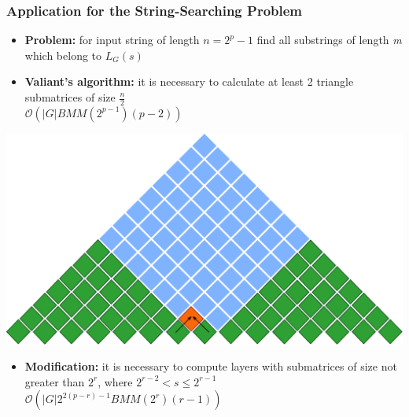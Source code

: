 \documentclass[xcolor=table]{beamer}
\begin{document}
\begin{frame}[fragile] \frametitle{Application for the String-Searching Problem}

    \begin{itemize}
      \item \textbf{Problem:} for input string of length $n = 2^p - 1$ find all substrings of length \textit{m} which belong to $L_G(s)$
      \item \textbf{Valiant's algorithm:} it is necessary to calculate at least 2 triangle submatrices of size $\frac{n}{2}$ \\ 
      $\mathcal{O}(|G|BMM(2^{p - 1})(p - 2))$
    \end{itemize}

    \centering\includegraphics[width = 0.5\linewidth]{pic/valsubstring3.pdf}


    \pause
    \begin{itemize}
      \item  \textbf{Modification:} it is necessary to compute layers with submatrices of size not greater than $2^r$, where $2^{r-2} < s \le 2^{r - 1}$ \\
      $\mathcal{O}(|G|2^{2(p - r) - 1}BMM(2^{r})(r - 1))$
  \end{itemize}

\end{frame}
\end{document}
